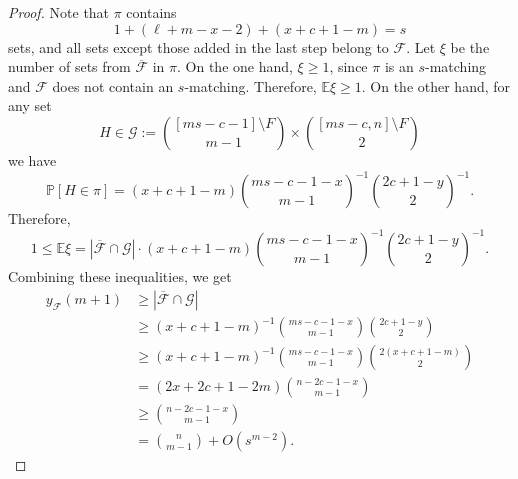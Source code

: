 \documentclass[10pt,a4paper]{amsart}
\newcommand{\m}{\mathcal}
\begin{document}
\begin{proof}
    Note that $\pi$ contains
    \[
    1+(\ell+m-x-2)+(x+c+1-m) = s
    \]
    sets, and all sets except those added in the last step belong to $\mathcal{F}$. Let $\xi$ be the number of sets from $\overline{\mathcal{F}}$ in $\pi$. On the one hand, $\xi \geq 1$, since $\pi$ is an $s$-matching and $\mathcal{F}$ does not contain an $s$-matching. Therefore, $\mathbb{E}\xi \geq 1$. On the other hand, for any set
    \[
    H \in \m G:={[ms-c-1] \setminus F \choose m-1} \times {[ms-c, n] \setminus F \choose 2}
    \]
    we have
    \[
    \mathbb{P}[H \in \pi] = (x+c+1-m){ms-c-1-x \choose m-1}^{-1}{2c+1-y \choose 2}^{-1}.
    \]
    Therefore,
    \[
    1\le \mathbb{E}\xi = |\overline{\mathcal{F}} \cap \m G|
    \cdot (x+c+1-m){ms-c-1-x \choose m-1}^{-1}{2c+1-y \choose 2}^{-1}.
    \]
    Combining these inequalities, we get
    \[
    \begin{split}
        y_{\mathcal{F}}(m+1)
        &\geq |\overline{\mathcal{F}} \cap \m G| \\
        &\geq (x+c+1-m)^{-1}{ms-c-1-x \choose m-1}{2c+1-y \choose 2} \\
        &\geq (x+c+1-m)^{-1}{ms-c-1-x \choose m-1}{2(x+c+1-m) \choose 2} \\
        &= (2x+2c+1-2m){n-2c-1-x \choose m-1} \\
        &\geq {n-2c-1-x \choose m-1} \\
        &= {n \choose m - 1} + O(s^{m - 2}).
    \end{split}
    \]
\end{proof}
\end{document}
